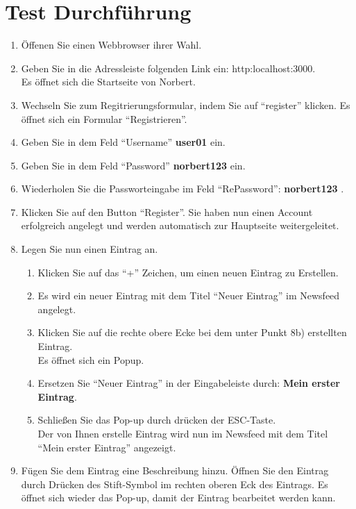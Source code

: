 \section{Test Durchführung}
\begin{enumerate}
\item Öffenen Sie einen Webbrowser ihrer Wahl.
\item Geben Sie in die Adressleiste folgenden Link ein: http:localhost:3000. \\Es öffnet sich die Startseite von Norbert.
\item Wechseln Sie zum Regitrierungsformular, indem Sie auf \enquote{register} klicken. Es öffnet sich ein Formular \enquote{Registrieren}.
\item Geben Sie in dem Feld \enquote{Username} \textbf{user01} ein.
\item Geben Sie in dem Feld \enquote{Password} \textbf{norbert123} ein.
\item Wiederholen Sie die Passworteingabe im Feld \enquote{RePassword}: \textbf{norbert123} .
\item Klicken Sie auf den Button \enquote{Register}. Sie haben nun einen Account erfolgreich angelegt und werden automatisch zur Hauptseite weitergeleitet. 
\item Legen Sie nun einen Eintrag an.
\begin{enumerate}
\item Klicken Sie auf das \enquote{+} Zeichen, um einen neuen Eintrag zu Erstellen.
\item Es wird ein neuer Eintrag mit dem Titel \enquote{Neuer Eintrag} im Newsfeed angelegt.
\item Klicken Sie auf die rechte obere Ecke bei dem unter Punkt 8b) erstellten Eintrag.\\ Es öffnet sich ein Popup.
\item Ersetzen Sie \enquote{Neuer Eintrag} in der Eingabeleiste durch: \textbf{ Mein erster Eintrag}.
\item Schließen Sie das Pop-up durch drücken der ESC-Taste.\\ Der von Ihnen erstelle Eintrag wird nun im Newsfeed mit dem Titel \enquote{Mein erster Eintrag} angezeigt.
\end{enumerate}
\item Fügen Sie dem Eintrag eine Beschreibung hinzu. Öffnen Sie den Eintrag durch Drücken des Stift-Symbol im rechten oberen Eck des Eintrags. Es öffnet sich wieder das Pop-up, damit der Eintrag bearbeitet werden kann.
\begin{enumerate}

\end{enumerate}
\end{enumerate}
